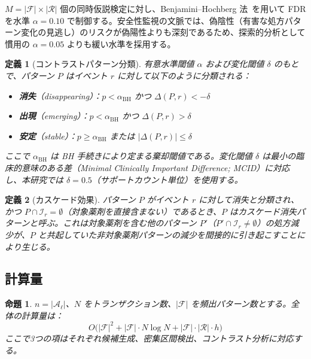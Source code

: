 \documentclass[11pt]{article}
\newtheorem{definition}{定義}
\newtheorem{proposition}{命題}
\begin{document}
$M = |\mathcal{F}| \times |\mathcal{R}|$ 個の同時仮説検定に対し、Benjamini--Hochberg 法~\citep{benjamini1995controlling}を用いて FDR を水準 $\alpha = 0.10$ で制御する。安全性監視の文脈では、偽陰性（有害な処方パターン変化の見逃し）のリスクが偽陽性よりも深刻であるため、探索的分析として慣用の $\alpha = 0.05$ よりも緩い水準を採用する。

\begin{definition}[コントラストパターン分類]\label{def:contrast}
有意水準閾値 $\alpha$ および変化閾値 $\delta$ のもとで、パターン $P$ はイベント $r$ に対して以下のように分類される：
\begin{itemize}
\item \textbf{消失}（disappearing）：$p < \alpha_{\mathrm{BH}}$ かつ $\Delta(P, r) < -\delta$
\item \textbf{出現}（emerging）：$p < \alpha_{\mathrm{BH}}$ かつ $\Delta(P, r) > \delta$
\item \textbf{安定}（stable）：$p \geq \alpha_{\mathrm{BH}}$ または $|\Delta(P, r)| \leq \delta$
\end{itemize}
ここで $\alpha_{\mathrm{BH}}$ は BH 手続きにより定まる棄却閾値である。変化閾値 $\delta$ は最小の臨床的意味のある差（Minimal Clinically Important Difference; MCID）に対応し、本研究では $\delta = 0.5$（サポートカウント単位）を使用する。
\end{definition}

\begin{definition}[カスケード効果]\label{def:cascade}
パターン $P$ がイベント $r$ に対して消失と分類され、かつ $P \cap \mathcal{I}_r = \emptyset$（対象薬剤を直接含まない）であるとき、$P$ は\emph{カスケード消失パターン}と呼ぶ。これは対象薬剤を含む他のパターン $P'$（$P' \cap \mathcal{I}_r \neq \emptyset$）の処方減少が、$P$ と共起していた非対象薬剤パターンの減少を間接的に引き起こすことにより生じる。
\end{definition}

\subsection{計算量}

\begin{proposition}\label{prop:complexity}
$n = |\mathcal{A}_\ell|$、$N$ をトランザクション数、$|\mathcal{F}|$ を頻出パターン数とする。全体の計算量は：
\[
O\bigl(|\mathcal{F}|^2 + |\mathcal{F}| \cdot N \log N + |\mathcal{F}| \cdot |\mathcal{R}| \cdot h\bigr)
\]
ここで3つの項はそれぞれ候補生成、密集区間検出、コントラスト分析に対応する。
\end{proposition}
\end{document}
